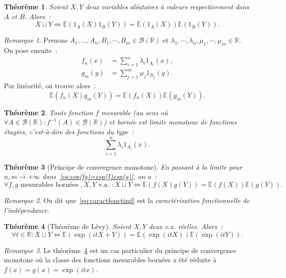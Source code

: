 \documentclass{article}
\newcommand{\E}{\mathbb E}
\newcommand{\R}{\mathbb R}
\newtheorem{thm}{Théorème}[section]
\theoremstyle{definition}
\theoremstyle{remark}
\newtheorem*{rmq}{Remarque}
\begin{document}
		\begin{thm} Soient $X, Y$ deux variables aléatoires à valeurs respectivement dans $A$ et $B$. Alors~:
		\[X \sqcup Y \iff \E\left(1_A(X)1_B(Y)\right) = \E(1_A(X))\E(1_B(Y)).\]
		\end{thm}

		\begin{rmq} Prenons $A_1, \dotsc, A_n, B_1, \dotsb, B_m \in \mathcal B(\R)$ et $\lambda_1, \dotsb, \lambda_n, \mu_1, \dotsb, \mu_m \in \R$.
		On pose ensuite~:
		\begin{align*}
			f_n(x) &= \sum_{i=1}^n\lambda_i1_{A_i}(x), \\
			g_m(y) &= \sum_{j=1}^m\mu_j1_{B_j}(y).
		\end{align*}
		Par linéarité, on trouve alors~:
		\begin{equation}\label{eq:esp(fg)=esp(f)esp(g)}
			\E\left(f_n(X)g_m(Y)\right) = \E(f_n(X))\E(g_m(Y)).
		\end{equation}
		\end{rmq}

		\begin{thm} Toute fonction $f$ mesurable (au sens où $\forall A \in \mathcal B(\R) : f^{-1}(A) \in \mathcal B(\R)$) et bornée est limite monotone de
		fonctions étagées, c'est-à-dire des fonctions du type~:
		\[\sum_{i=1}^n\lambda_i1_{A_i}(x).\]
		\end{thm}

		\begin{thm}[Principe de convergence monotone] En passant à la limite pour $n, m \to +\infty$ dans~\eqref{eq:esp(fg)=esp(f)esp(g)}, on a~:
		\begin{equation}\label{eq:caractfonctind}
			\forall f, g \text{ mesurables bornées }, X, Y \text{ v.a. } : X \sqcup Y \iff \E(f(X)g(Y)) = \E(f(X))\E(g(Y)).
		\end{equation}
		\end{thm}

		\begin{rmq} On dit que~\eqref{eq:caractfonctind} est la \emph{caractérisation fonctionnelle de l'indépendance}. \end{rmq}

		\begin{thm}[Théorème de Lévy]\label{thm:Lévyindé} Soient $X, Y$ deux v.a. réelles. Alors~:
		\[\forall t \in \R : X \sqcup Y \iff \E(\exp(itX+Y)) = \E(\exp(itX))\E(\exp(itY)).\]
		\end{thm}

		\begin{rmq} Le théorème~\ref{thm:Lévyindé} est un cas particulier du principe de convergence monotone où la classe des fonctions mesurables bornées
		a été réduite à $f(x) = g(x) = \exp(itx)$. \end{rmq}
\end{document}
